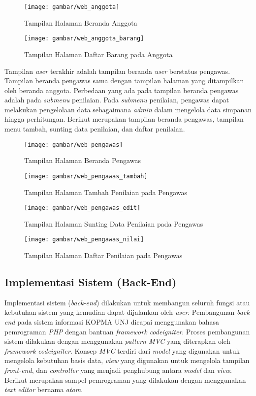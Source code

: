 \begin{figure}[H]
	\centering
	\texttt{[image: gambar/web\_anggota]}
	\caption{Tampilan Halaman Beranda Anggota}
\end{figure} 

\begin{figure}[H]
	\centering
	\texttt{[image: gambar/web\_anggota\_barang]}
	\caption{Tampilan Halaman Daftar Barang pada Anggota}
\end{figure} 

Tampilan \textit{user} terakhir adalah tampilan beranda \textit{user} berstatus pengawas. Tampilan beranda pengawas sama dengan tampilan halaman yang ditampilkan oleh beranda anggota. Perbedaan yang ada pada tampilan beranda pengawas adalah pada \textit{submenu} penilaian. Pada \textit{submenu} penilaian, pengawas dapat melakukan pengelolaan data sebagaimana \textit{admin} dalam mengelola data simpanan hingga perhitungan. Berikut merupakan tampilan beranda pengawas, tampilan menu tambah, sunting data penilaian, dan daftar penilaian.

\begin{figure}[H]
	\centering
	\texttt{[image: gambar/web\_pengawas]}
	\caption{Tampilan Halaman Beranda Pengawas}
\end{figure} 

\begin{figure}[H]
	\centering
	\texttt{[image: gambar/web\_pengawas\_tambah]}
	\caption{Tampilan Halaman Tambah Penilaian pada Pengawas}
\end{figure} 

\begin{figure}[H]
	\centering
	\texttt{[image: gambar/web\_pengawas\_edit]}
	\caption{Tampilan Halaman Sunting Data Penilaian pada Pengawas}
\end{figure} 

\begin{figure}[H]
	\centering
	\texttt{[image: gambar/web\_pengawas\_nilai]}
	\caption{Tampilan Halaman Daftar Penilaian pada Pengawas}
\end{figure} 

\subsection{Implementasi Sistem (Back-End)}
Implementasi sistem (\textit{back-end}) dilakukan untuk membangun seluruh fungsi atau kebutuhan sistem yang kemudian dapat dijalankan oleh \textit{user}. Pembangunan \textit{back-end} pada sistem informasi KOPMA UNJ dicapai menggunakan bahasa pemrograman \textit{PHP} dengan bantuan \textit{framework codeigniter}. Proses pembangunan sistem dilakukan dengan menggunakan \textit{pattern MVC} yang diterapkan oleh \textit{framework codeigniter}. Konsep \textit{MVC} terdiri dari \textit{model} yang digunakan untuk mengelola kebutuhan basis data, \textit{view} yang digunakan untuk mengelola tampilan \textit{front-end}, dan \textit{controller} yang menjadi penghubung antara \textit{model} dan \textit{view}. Berikut merupakan sampel pemrograman yang dilakukan dengan menggunakan \textit{text editor} bernama \textit{atom}.


